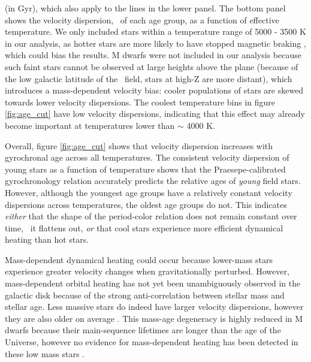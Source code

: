 (in Gyr), which also apply to the lines in the lower panel.
The bottom panel shows the velocity dispersion, \sigmavb\ of each age group,
as a function of effective temperature.
We only included stars within a temperature range of 5000 - 3500 K in our
analysis, as hotter stars are more likely to have stopped magnetic braking
\citep{vansaders2016}, which could bias the results.
M dwarfs were not included in our analysis because such faint stars cannot be
observed at large heights above the plane (because of the low galactic
latitude of the \kepler\ field, stars at high-Z are more distant), which
introduces a mass-dependent velocity bias: cooler populations of stars are
skewed towards lower velocity dispersions.
The coolest temperature bins in figure \ref{fig:age_cut} have low velocity
dispersions, indicating that this effect may already become important at
temperatures lower than $\sim$ 4000 K.

Overall, figure \ref{fig:age_cut} shows that velocity dispersion increases
with gyrochronal age across all temperatures.
The consistent velocity dispersion of young stars as a function of temperature
shows that the Praesepe-calibrated gyrochronology relation accurately predicts
the relative ages of {\it young} field stars.
However, although the youngest age groups have a relatively constant velocity
dispersions across temperatures, the oldest age groups do not.
This indicates {\it either} that the shape of the period-color relation does
not remain constant over time, \ie\ it flattens out, {\it or} that cool stars
experience more efficient dynamical heating than hot stars.

Mass-dependent dynamical heating could occur because lower-mass stars
experience greater velocity changes when gravitationally perturbed.
However, mass-dependent orbital heating has not yet been unambiguously
observed in the galactic disk because of the strong anti-correlation between
stellar mass and stellar age.
Less massive stars do indeed have larger velocity dispersions, however they
are also older on average .
This mass-age degeneracy is highly reduced in M dwarfs because their
main-sequence lifetimes are longer than the age of the Universe, however no
evidence for mass-dependent heating has been detected in these low mass stars
\citep{faherty2009}.

